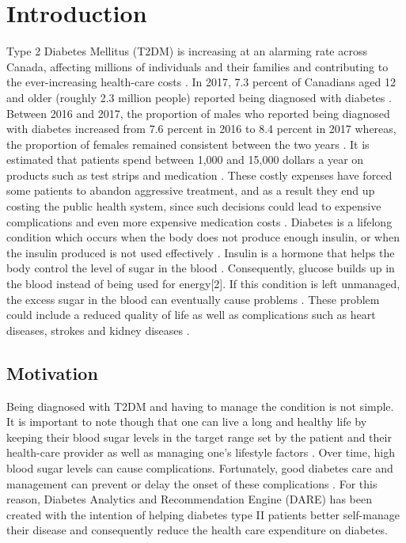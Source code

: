 \chapter{Introduction}
\label{cha:introduction}
Type 2 Diabetes Mellitus (T2DM) is increasing at an alarming rate across Canada, affecting millions of individuals and their families and contributing to the ever-increasing health-care costs \cite{1}. 
In 2017, 7.3 percent of Canadians aged 12 and older (roughly 2.3 million people) reported being diagnosed with diabetes \cite{2}. Between 2016 and 2017, the proportion of males who reported being diagnosed with diabetes increased from 7.6 percent in 2016 to 8.4 percent in 2017 whereas, the proportion of females remained consistent between the two years \cite{2}. It is estimated that patients spend between 1,000 and 15,000 dollars a year on products such as test strips and medication \cite{1}. These costly expenses have forced some patients to abandon aggressive treatment, and as a result they end up costing the public health system, since such decisions could lead to expensive complications and even more expensive medication costs \cite{1}.
Diabetes is a lifelong condition which occurs when the body does not produce enough insulin, or when the insulin produced is not used effectively \cite{3}. Insulin is a hormone that helps the body control the level of sugar in the blood \cite{3}.
Consequently, glucose builds up in the blood instead of being used for energy[2]. If this condition is left unmanaged, the excess sugar in the blood can eventually cause problems \cite{3}. These problem could include a reduced quality of life as well as complications such as heart diseases, strokes and kidney diseases \cite{3}. 

\section{Motivation}
\label{sec:motivation}
Being diagnosed with T2DM and having to manage the condition is not simple. It is important to note though that one can live a long and healthy life by keeping their blood sugar levels in the target range set by the patient and their health-care provider as well as managing one's lifestyle factors \cite{1}.
Over time, high blood sugar levels can cause complications. Fortunately, good diabetes care and management can prevent or delay the onset of these complications \cite{1}.
For this reason, Diabetes Analytics and Recommendation Engine (DARE) has been created with the intention of helping diabetes type II patients better self-manage their disease and consequently reduce the health care expenditure on diabetes. 

